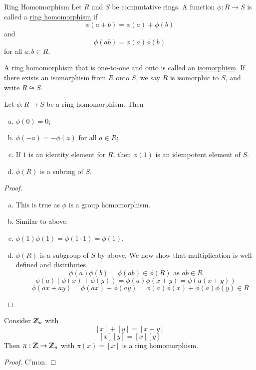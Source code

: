 \begin{defn}{Ring Homomorphism}
	Let $R$ and $S$ be commutative rings. A function $\phi:R\to S$ is called a \ul{ring homomorphism} if
	\begin{equation}
		\phi(a+b) = \phi(a) + \phi(b)
	\end{equation}
	and
	\begin{equation}
		\phi(ab) = \phi(a)\phi(b)
	\end{equation}
	for all $a,b\in R$. 
	
	A ring homomorphism that is one-to-one and onto is called an \ul{isomorphism}. If there exists an isomorphism from $R$ onto $S$, we say $R$ is isomorphic to $S$, and write $R\cong S$. 
\end{defn}

\begin{proposition}
	Let $\phi:R\to S$ be a ring homomorphism. Then
	\begin{enumerate}[(a)]
		\item $\phi(0) = 0$;
		\item $\phi(-a)=-\phi(a)$ for all $a\in R$;
		\item If $1$ is an identity element for $R$, then $\phi(1)$ is an idempotent element of $S$. 
		\item $\phi(R)$ is a subring of $S$. 
	\end{enumerate}
\end{proposition}
\begin{proof}\!
\begin{enumerate}[(a)]
	\item This is true as $\phi$ is a group homomorphism. 
	\item Similar to above. 
	\item $\phi(1)\phi(1) = \phi(1\cdot 1) = \phi(1)$. 
	\item $\phi(R)$ is a subgroup of $S$ by above. We now show that multiplication is well defined and distributes. 
	\[\phi(a)\phi(b) = \phi(ab)\in\phi(R)\text{ as }ab\in R\]
	\[\phi(a)(\phi(x) + \phi(y)) = \phi(a)\phi(x+y) = \phi(a(x+y))\]
	\[= \phi(ax + ay) = \phi(ax) + \phi(ay) = \phi(a)\phi(x) + \phi(a)\phi(y)\in R\]
\end{enumerate}
\end{proof}
\example
Consider $\mathbb{Z}_n$ with
\[[x] + [y] = [x+y]\]
\[[x][y]=[x][y]\]
Then $\pi: \mathbb{Z}\to \mathbb{Z}_n$ with $\pi(x) = [x]$ is a ring homomorphism. 
\begin{proof}
	C'mon. 
\end{proof}

